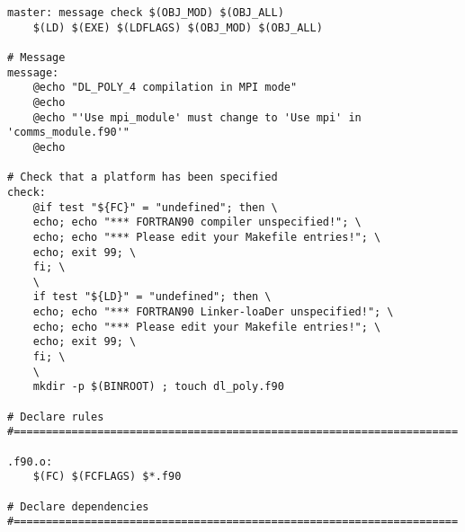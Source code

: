 \begin{verbatim}
master: message check $(OBJ_MOD) $(OBJ_ALL)
	$(LD) $(EXE) $(LDFLAGS) $(OBJ_MOD) $(OBJ_ALL)

# Message
message:
	@echo "DL_POLY_4 compilation in MPI mode"
	@echo
	@echo "'Use mpi_module' must change to 'Use mpi' in 'comms_module.f90'"
	@echo

# Check that a platform has been specified
check:
	@if test "${FC}" = "undefined"; then \
	echo; echo "*** FORTRAN90 compiler unspecified!"; \
	echo; echo "*** Please edit your Makefile entries!"; \
	echo; exit 99; \
	fi; \
	\
	if test "${LD}" = "undefined"; then \
	echo; echo "*** FORTRAN90 Linker-loaDer unspecified!"; \
	echo; echo "*** Please edit your Makefile entries!"; \
	echo; exit 99; \
	fi; \
	\
	mkdir -p $(BINROOT) ; touch dl_poly.f90

# Declare rules
#=====================================================================

.f90.o:
	$(FC) $(FCFLAGS) $*.f90

# Declare dependencies
#=====================================================================


\end{verbatim}
